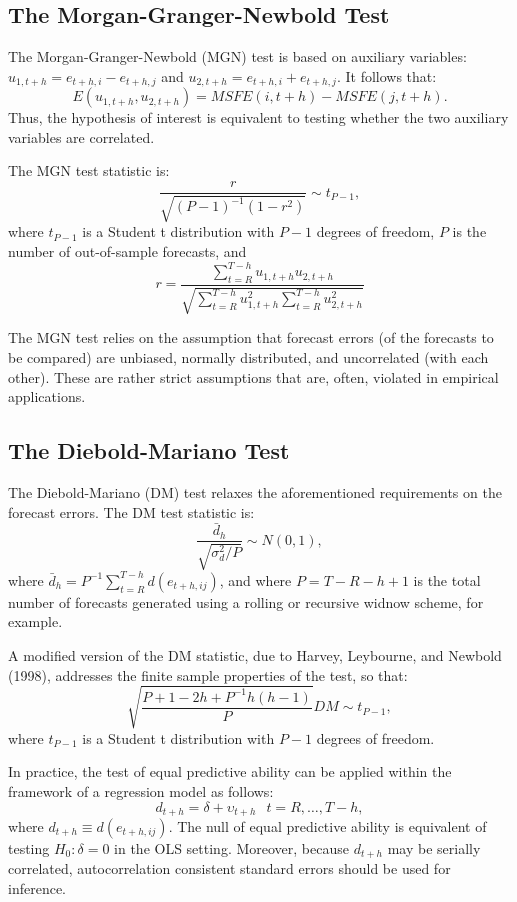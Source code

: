 \documentclass[
  oneside]{book}
\begin{document}
\hypertarget{the-morgan-granger-newbold-test}{%
\subsection{The Morgan-Granger-Newbold Test}\label{the-morgan-granger-newbold-test}}

The Morgan-Granger-Newbold (MGN) test is based on auxiliary variables: \(u_{1,t+h} = e_{t+h,i}-e_{t+h,j}\) and \(u_{2,t+h} = e_{t+h,i}+e_{t+h,j}\). It follows that: \[E(u_{1,t+h},u_{2,t+h}) = MSFE(i,t+h)-MSFE(j,t+h).\] Thus, the hypothesis of interest is equivalent to testing whether the two auxiliary variables are correlated.

The MGN test statistic is: \[\frac{r}{\sqrt{(P-1)^{-1}(1-r^2)}}\sim t_{P-1},\] where \(t_{P-1}\) is a Student t distribution with \(P-1\) degrees of freedom, \(P\) is the number of out-of-sample forecasts, and \[r=\frac{\sum_{t=R}^{T-h}{u_{1,t+h}u_{2,t+h}}}{\sqrt{\sum_{t=R}^{T-h}{u_{1,t+h}^2}\sum_{t=R}^{T-h}{u_{2,t+h}^2}}}\]

The MGN test relies on the assumption that forecast errors (of the forecasts to be compared) are unbiased, normally distributed, and uncorrelated (with each other). These are rather strict assumptions that are, often, violated in empirical applications.

\hypertarget{the-diebold-mariano-test}{%
\subsection{The Diebold-Mariano Test}\label{the-diebold-mariano-test}}

The Diebold-Mariano (DM) test relaxes the aforementioned requirements on the forecast errors. The DM test statistic is: \[\frac{\bar{d}_h}{\sqrt{\sigma_d^2/P}} \sim N(0,1),\] where \(\bar{d}_h=P^{-1}\sum_{t=R}^{T-h} d(e_{t+h,ij})\), and where \(P=T-R-h+1\) is the total number of forecasts generated using a rolling or recursive widnow scheme, for example.

A modified version of the DM statistic, due to Harvey, Leybourne, and Newbold (1998), addresses the finite sample properties of the test, so that: \[\sqrt{\frac{P+1-2h+P^{-1}h(h-1)}{P}}DM\sim t_{P-1},\] where \(t_{P-1}\) is a Student t distribution with \(P-1\) degrees of freedom.

In practice, the test of equal predictive ability can be applied within the framework of a regression model as follows: \[d_{t+h} = \delta + \upsilon_{t+h}\;~~t = R,\ldots,T-h,\] where \(d_{t+h} \equiv d(e_{t+h,ij})\). The null of equal predictive ability is equivalent of testing \(H_0: \delta = 0\) in the OLS setting. Moreover, because \(d_{t+h}\) may be serially correlated, autocorrelation consistent standard errors should be used for inference.
\end{document}
